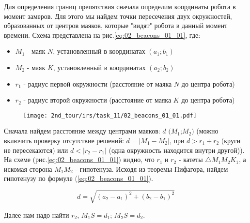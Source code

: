 \solutionSection

Для определения границ препятствия сначала определим координаты робота в момент замеров. Для этого мы найдем точки пересечения двух окружностей, образованных от центров маяков, которые "видят" робота в данный момент времени. Схема представлена на рис.\ref{eq:02_beacons_01_01}, где: \\

\begin{itemize}
	\item $M_1$ - маяк $N$, установленный в координатах $(a_1; b_1)$
	\item $M_2$ - маяк $K$, установленный в координатах $(a_2; b_2)$
	\item $r_1$ - радиус первой окружности (расстояние от маяка $N$ до центра робота)
	\item $r_2$ - радиус второй окружности (расстояние от маяка $K$ до центра робота)
\end{itemize}

\begin{figure}[h!]
	\centering
	\texttt{[image: 2nd\_tour/irs/task\_11/02\_beacons\_01\_01.pdf]}
	\caption{}
	\label{fig:02_beacons_01_01}
\end{figure}

Сначала найдем расстояние между центрами маяков: $d$ $(M_1$;$M_2)$ (можно включить проверку отсутствие решений: $d = |M_1 - M_2|$, при $d > r_1 + r_2$ (круги не пересекаются) или $d < |r_2 - r_1|$ (одна окружность находится внутри другой)).
На схеме (рис.\ref{eq:02_beacons_01_01}) видно, что $r_1$ и $r_2$ - катеты $\triangle M_1M_2K_1$, а искомая сторона $M_1M_2$ - гипотенуза. Исходя из теоремы Пифагора, найдем гипотенузу по формуле (\ref{eq:02_beacons_01_01}).

\begin{equation}
	d = \sqrt{{(a_2 - a_1)}^2 + {(b_2 - b_1)}^2}
	\label{eq:02_beacons_01_01}
\end{equation}

Далее нам надо найти $r_2$, $M_1S = d_1$; $M_2S = d_2$.

